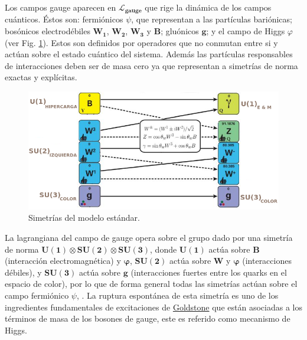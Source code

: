 Los campos gauge aparecen en $\mathcal{L}_{\mathbf{gauge}}$ que rige la dinámica de los campos cuánticos. Éstos son: fermiónicos $\psi$, que representan a las partículas bariónicas; bosónicos electrodébiles $\mathbf{W_1}$, $\mathbf{W_2} $, $\mathbf{W_3}$ y $\mathbf{B}$; gluónicos $\mathbf{g}$; y el campo de Higgs $\varphi$ (ver Fig. \ref{simetrias}). Estos son definidos por operadores que no conmutan entre si y actúan sobre el estado cuántico del sistema. Además las partículas responsables de interacciones deben ser de masa cero ya que representan a simetrías de norma exactas y explícitas.
 
\begin{figure}[!t]
\centering
\includegraphics[width=1\textwidth]{Cap1/imagenes/simetria0.png}
\caption[Simetrías del modelo estándar]{Simetrías del modelo estándar.\footnotemark}
\label{simetrias}
\end{figure}

La lagrangiana del campo de gauge opera sobre el grupo dado por una simetría de norma $\mathbf{U(1) \otimes SU(2) \otimes SU(3)}$, donde $\mathbf{U(1)}$ actúa sobre $\mathbf{B}$ (interacción electromagnética) y $\mathbf{\varphi}$, $\mathbf{SU(2)}$ actúa sobre $\mathbf{W}$ y $\mathbf{\varphi}$ (interacciones débiles), y $\mathbf{SU(3)}$ actúa sobre $\mathbf{g}$ (interacciones fuertes entre los quarks en el espacio de color), por lo que de forma general todas las simetrías actúan sobre el campo fermiónico $\psi$, \citep{ME}.
La ruptura espontánea de esta simetría es uno de los ingredientes fundamentales de excitaciones de \href{https://es.wikipedia.org/wiki/Bos\%C3\%B3n\_de\_Goldstone}{Goldstone} que están asociadas a los términos de masa de los bosones de gauge, este es referido como mecanismo de Higgs.

